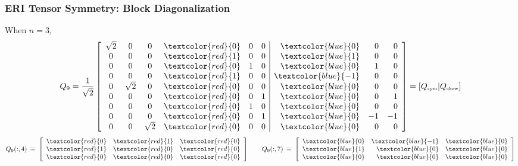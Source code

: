 \documentclass[bigger]{beamer}
\begin{document}
\begin{frame}
\frametitle{ERI Tensor Symmetry: Block Diagonalization}
\label{sec-1-21}

When $n=3$, 
\hspace{-2em}
\begin{equation*}
Q_{9} = \frac{1}{\sqrt{2}}
\left[
\begin{array}{cccccc|rrr}
\sqrt{2} & 0 & 0  & \textcolor{red}{0} & 0 &0 &\textcolor{blue}{0} &0 &0 \\
0 & 0 & 0  & \textcolor{red}{1} & 0 &0 &\textcolor{blue}{1} &0 &0 \\
0 & 0 & 0  & \textcolor{red}{0} & 1 &0 &\textcolor{blue}{0} &1 &0 \\
0 & 0 & 0  & \textcolor{red}{1} & 0 &0 &\textcolor{blue}{-1} &0 &0 \\
0 & \sqrt{2} & 0  & \textcolor{red}{0} & 0 &0 &\textcolor{blue}{0} &0 &0 \\
0 & 0 & 0  & \textcolor{red}{0} & 0 &1 &\textcolor{blue}{0} & 0 &1 \\
0 & 0 & 0  & \textcolor{red}{0} & 1 &0 &\textcolor{blue}{0} &0 &0 \\
0 & 0 & 0  & \textcolor{red}{0} & 0 &1 &\textcolor{blue}{0} &{-1} &{-1} \\
0 & 0 & \sqrt{2}  & \textcolor{red}{0} & 0 &0 &\textcolor{blue}{0} &0 &0 
\end{array}
\right]
= \left[ Q_{\mbox{\tiny sym}} | Q_{\mbox{\tiny skew}} \right]
\end{equation*}
\hspace{-3em}
\[
Q_{9}(:,4) \:\equiv \: \left[ \begin{array}{ccc} \textcolor{red}{0} & \textcolor{red}{1} & \textcolor{red}{0} \\ \textcolor{red}{1} & \textcolor{red}{0} & \textcolor{red}{0} \\ \textcolor{red}{0} & \textcolor{red}{0} & \textcolor{red}{0} \end{array} \right]
\qquad
Q_{9}(:,7) \:\equiv \: \left[ \begin{array}{rrr} \textcolor{blue}{0} & \textcolor{blue}{-1} & \textcolor{blue}{0} \\ \textcolor{blue}{1} & \textcolor{blue}{0} & \textcolor{blue}{0} \\ \textcolor{blue}{0} & \textcolor{blue}{0} & \textcolor{blue}{0} \end{array} \right]
\]
\end{frame}
\end{document}
